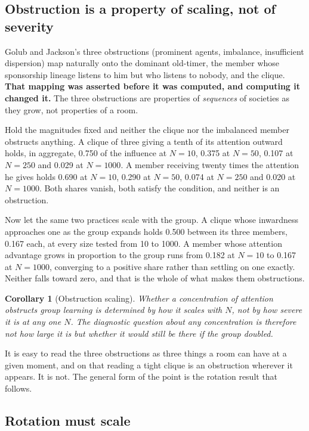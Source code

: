 \documentclass[11pt,a4paper]{article}
\newtheorem{corollary}[proposition]{Corollary}
\begin{document}
\subsection{Obstruction is a property of scaling, not of severity}

Golub and Jackson's three obstructions (prominent agents, imbalance, insufficient
dispersion) map naturally onto the dominant old-timer, the member whose
sponsorship lineage listens to him but who listens to nobody, and the clique.
\textbf{That mapping was asserted before it was computed, and computing it changed
it.} The three obstructions are properties of \emph{sequences} of societies as
they grow, not properties of a room.

Hold the magnitudes fixed and neither the clique nor the imbalanced member
obstructs anything. A clique of three giving a tenth of its attention outward
holds, in aggregate, 0.750 of the influence at $N=10$, 0.375 at $N=50$, 0.107 at
$N=250$ and 0.029 at $N=1000$. A member receiving twenty times the attention he
gives holds 0.690 at $N=10$, 0.290 at $N=50$, 0.074 at $N=250$ and 0.020 at
$N=1000$. Both shares vanish, both satisfy the condition, and neither is an
obstruction.

Now let the same two practices scale with the group. A clique whose inwardness
approaches one as the group expands holds 0.500 between its three members, 0.167
each, at every size tested from 10 to 1000. A member whose attention advantage grows in proportion to the group runs
from 0.182 at $N=10$ to 0.167 at $N=1000$, converging to a positive share rather
than settling on one exactly. Neither falls toward zero, and that is the whole of
what makes them obstructions.

\begin{corollary}[Obstruction scaling]
Whether a concentration of attention obstructs group learning is determined by how
it scales with $N$, not by how severe it is at any one $N$. The diagnostic
question about any concentration is therefore not how large it is but whether it
would still be there if the group doubled.
\end{corollary}

It is easy to read the three obstructions as three things a room can have at a
given moment, and on that reading a tight clique is an obstruction wherever it
appears. It is not. The general form of the point is the rotation result that
follows.

\subsection{Rotation must scale}
\end{document}
